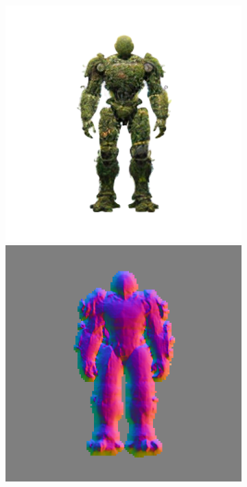 \begin{figure}[H]
\begin{subfigure}[b]{0.18\textwidth}
        \caption{}
    \end{subfigure}
    \begin{subfigure}[b]{0.18\textwidth}
        \centering
        \fontsize{9pt}{7pt}\selectfont{}
        \includegraphics[width=\textwidth]{etc/a robot made out of plants/wonder3d/test/wonder3D_6000_front_part1}
        \includegraphics[width=\textwidth]{etc/a robot made out of plants/wonder3d/test/wonder3D_6000_front_part4}

\end{subfigure}
\end{figure}
